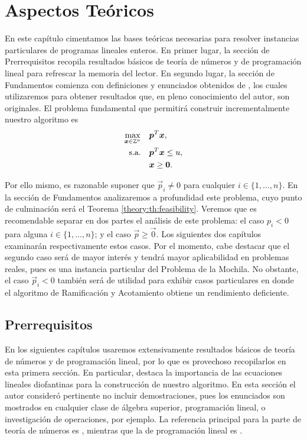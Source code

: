 \chapter{Aspectos Teóricos}


\noindent
En este capítulo cimentamos las bases teóricas necesarias para resolver instancias particulares de
programas lineales enteros. En primer lugar, la sección de Prerrequisitos recopila resultados
básicos de teoría de números y de programación lineal para refrescar la memoria del lector. En
segundo lugar, la sección de Fundamentos comienza con definiciones y enunciados obtenidos de
\cite{herr}, los cuales utilizaremos para obtener resultados que, en pleno conocimiento del autor,
son originales. El problema fundamental que permitirá construir incrementalmente nuestro algoritmo
es
\begin{subequations}
	\label{theory:formulation}
	\begin{align}
		\max_{\boldsymbol{x} \in \mathbb{Z}^n} \quad
			& \boldsymbol{p}^T\boldsymbol{x}, \label{theory:objective} \\
		\text{s.a.} \quad
			& \boldsymbol{p}^T\boldsymbol{x} \leq u, \label{theory:constraint:budget} \\
			& \boldsymbol{x} \geq \boldsymbol{0}. \nonumber
	\end{align}
\end{subequations}

Por ello mismo, es razonable suponer que $\vec{p}_i \neq 0$ para cualquier $i \in \lbrace 1, \ldots,
n \rbrace$. En la sección de Fundamentos analizaremos a profundidad este problema, cuyo punto de
culminación será el Teorema \ref{theory:th:feasibility}. Veremos que es recomendable separar en dos
partes el análisis de este problema: el caso $p_i < 0$ para alguna $i \in \lbrace 1, \ldots, n
\rbrace$; y el caso $\vec{p} \geq \vec{0}$. Los siguientes dos capítulos examinarán respectivamente
estos casos. Por el momento, cabe destacar que el segundo caso será de mayor interés y tendrá mayor
aplicabilidad en problemas reales, pues es una instancia particular del Problema de la Mochila. No
obstante, el caso $\vec{p}_i < 0$ también será de utilidad para exhibir casos particulares en donde
el algoritmo de Ramificación y Acotamiento obtiene un rendimiento deficiente.

\section{Prerrequisitos}
\noindent
En los siguientes capítulos usaremos extensivamente resultados básicos de teoría de números y de
programación lineal, por lo que es provechoso recopilarlos en esta primera sección. En
particular, destaca la importancia de las ecuaciones lineales diofantinas para la construcción
de nuestro algoritmo. En esta sección el autor consideró pertinente no incluir demostraciones, pues los
enunciados son mostrados en cualquier clase de álgebra superior, programación lineal, o
investigación de operaciones, por ejemplo. La referencia principal para la parte de teoría de
números es \cite{carmen}, mientras que la de programación lineal es \cite{alex}.

